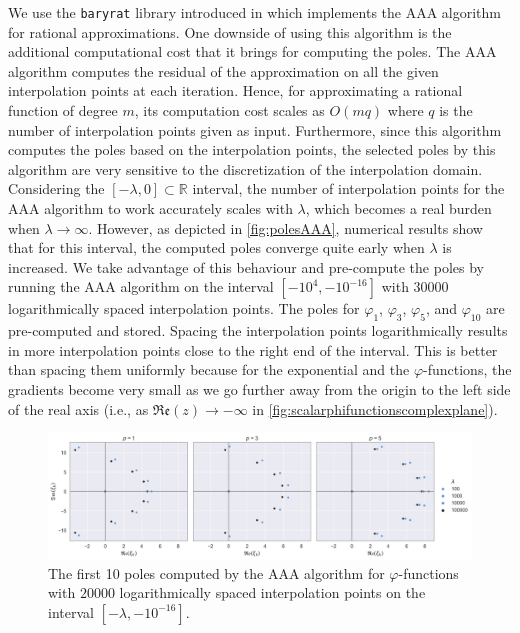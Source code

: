 We use the \texttt{baryrat} library introduced in \cite{hofreither2021BRASIL} which implements
the AAA algorithm for rational approximations. One downside of using this algorithm
is the additional computational cost that it brings for computing the poles.
The AAA algorithm  computes the residual of the approximation on all the given interpolation points at
each iteration. Hence, for approximating a rational function of degree $m$, its computation cost scales
as $O(mq)$ where $q$ is the number of interpolation points given as input.
Furthermore, since this algorithm computes the poles based on the interpolation points, the
selected poles by this algorithm are very sensitive to the discretization of the interpolation domain.
Considering the $[-\lambda, 0] \subset \mathbb{R}$ interval, the number of interpolation
points for the AAA algorithm to work accurately scales with $\lambda$, which becomes a real burden
when $\lambda \to \infty$. However, as depicted in \autoref{fig:polesAAA}, numerical results show that
for this interval, the computed poles converge quite early when $\lambda$ is increased. We take
advantage of this behaviour and pre-compute the poles by running the AAA algorithm
on the interval $[-10^{4}, -10^{-16}]$ with $30000$ logarithmically spaced interpolation points.
The poles for $\varphi_1$, $\varphi_3$, $\varphi_5$, and $\varphi_{10}$ are pre-computed and stored.
Spacing the interpolation points logarithmically results in more interpolation points close to
the right end of the interval. This is better than spacing them uniformly because for the
exponential and the $\varphi$-functions, the gradients become very small as we go further away
from the origin to the left side of the real axis (i.e.,
as $\mathfrak{Re}(z) \to -\infty$ in \autoref{fig:scalarphifunctionscomplexplane}).

\begin{figure}[h]
    \centering
    \includegraphics[width=.9\textwidth]{img/AAA/poles_lambda_log20k_m10.png}
    \caption{
        The first 10 poles computed by the AAA algorithm for $\varphi$-functions with $20000$
        logarithmically spaced interpolation points on the interval $[-\lambda, -10^{-16}]$.
    }
    \label{fig:polesAAA}
\end{figure}

